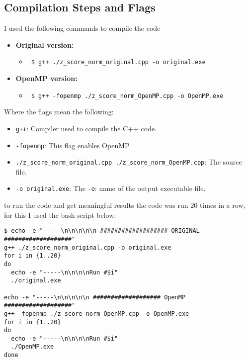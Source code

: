 \documentclass{article}
\begin{document}
\subsection{Compilation Steps and Flags} \label{sec:compilation}
I used the following commands to compile the code
\begin{itemize}
    \item \textbf{Original version:}
          \begin{itemize}
              \item \begin{verbatim} $ g++ ./z_score_norm_original.cpp -o original.exe  \end{verbatim}
          \end{itemize}
    \item \textbf{OpenMP version:}
          \begin{itemize}
              \item \begin{verbatim} $ g++ -fopenmp ./z_score_norm_OpenMP.cpp -o OpenMP.exe \end{verbatim}
          \end{itemize}

\end{itemize}
Where the flags mean the following:
\begin{itemize}
    \item \texttt{g++}: Compiler used to compile the C++ code.
    \item \texttt{-fopenmp}: This flag enables OpenMP.
    \item \texttt{./z\_score\_norm\_original.cpp ./z\_score\_norm\_OpenMP.cpp}: The source file.
    \item \texttt{-o original.exe}: The \texttt{-o}: name of the output executable file.
\end{itemize}

to run the code and get meaningful results the code was run 20 times in a row, for this I used the bash script below.
\begin{scriptsize}
    \begin{verbatim}
$ echo -e "-----\n\n\n\n\n ################### ORIGINAL ###################"
g++ ./z_score_norm_original.cpp -o original.exe
for i in {1..20}
do
  echo -e "-----\n\n\n\nRun #$i"
  ./original.exe

echo -e "-----\n\n\n\n\n ################### OpenMP ###################"
g++ -fopenmp ./z_score_norm_OpenMP.cpp -o OpenMP.exe 
for i in {1..20}
do
  echo -e "-----\n\n\n\nRun #$i"
  ./OpenMP.exe
done
\end{verbatim}
\end{scriptsize}
\end{document}
